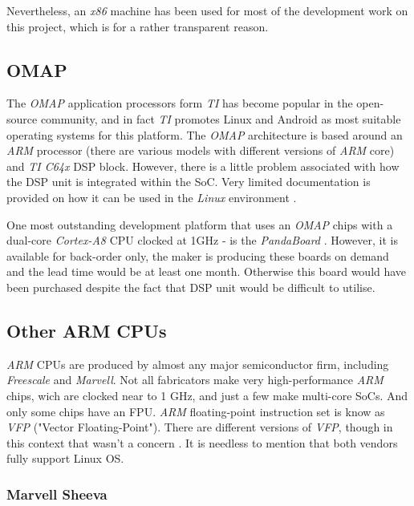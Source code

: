   Nevertheless, an \emph{x86} machine has been used for most of the
 development work on this project, which is for a rather transparent
 reason.


\subsection{OMAP}

  The \emph{OMAP} application processors form \emph{TI} has become
 popular in the open-source community, and in fact \emph{TI} promotes
 Linux and Android as most suitable operating systems for this platform.
 The \emph{OMAP} architecture is based around an \emph{ARM} processor
 (there are various models with different versions of \emph{ARM} core)
 and \emph{TI C64x} DSP block. However, there is a little problem
 associated with how the DSP unit is integrated within the SoC.
 Very limited documentation is provided on how it can be used in the
 \emph{Linux} environment \cite{ti:omap:wiki:dsp}.

 One most outstanding development platform that uses an \emph{OMAP}
 chips with a dual-core \emph{Cortex-A8} CPU clocked at 1GHz - is the
 \emph{PandaBoard} \cite{ti:omap:wiki:pb}. However, it is available
 for back-order only, the maker is producing these boards on demand
 and the lead time would be at least one month. Otherwise this board
 would have been purchased despite the fact that DSP unit would be
 difficult to utilise.

\subsection{Other ARM CPUs}

  \emph{ARM} CPUs are produced by almost any major semiconductor firm,
 including \emph{Freescale} and \emph{Marvell}. Not all fabricators
 make very high-performance \emph{ARM} chips, wich are clocked near to
 1 GHz, and just a few make multi-core SoCs. And only some chips have an
 FPU. \emph{ARM} floating-point instruction set is know as \emph{VFP}
 ("Vector Floating-Point"). There are different versions of \emph{VFP},
 though in this context that wasn't a concern \cite{links:arm:vfp}.
 It is needless to mention that both vendors fully support Linux OS.

\subsubsection{Marvell Sheeva}


